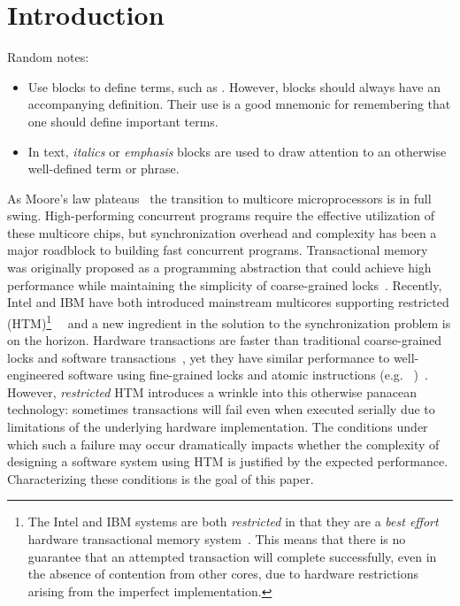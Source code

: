 \section{Introduction}
Random notes:
\begin{itemize}
\item Use  blocks to define terms, such as 
.  However,  
blocks should always have an accompanying definition.  Their
use is a good mnemonic for remembering that one should define
important terms.
\item In text, \textit{italics} or \emph{emphasis} blocks
are used to draw attention to an otherwise well-defined term
or phrase.  
\end{itemize}


As Moore's law plateaus~\cite{Vardi14} the transition
to multicore microprocessors is in full swing. High-performing concurrent
programs require the effective utilization of these multicore chips, but 
synchronization overhead and complexity has been a
major roadblock to building fast concurrent programs.
Transactional memory~\cite{HerlihyMo93} was originally
proposed as a programming abstraction that could achieve
high performance while maintaining the simplicity of 
coarse-grained locks~\cite{YooHuLa13}.
Recently, Intel and IBM
have both introduced mainstream 
multicores supporting restricted  (HTM)\footnote{The Intel and IBM
systems are both \emph{restricted} in that they are 
a \emph{best effort} hardware transactional
memory system~\cite{YooHuLa13}.  This means that there is no 
guarantee that an attempted
transaction will complete successfully, even in the absence 
of contention from other cores, due to hardware restrictions
arising from the imperfect implementation.}~\cite{Reinders12}~\cite{LeGuWi15}
and a new ingredient in the solution 
to the synchronization problem is
on the horizon. Hardware transactions are faster than traditional
coarse-grained locks and software transactions~\cite{YooHuLa13}, 
yet they have similar performance to well-engineered software
using fine-grained locks and atomic instructions (e.g.
~\cite{Herlihy91})~\cite{YooHuLa13}. 
However, \emph{restricted} HTM introduces a wrinkle into 
this otherwise panacean technology: sometimes transactions
will fail even when executed serially due to limitations
of the underlying hardware implementation.  The conditions
under which such a failure may occur dramatically impacts
whether the complexity of designing a software system using HTM
is justified by the expected performance.  Characterizing
these conditions is the goal of this paper. 


